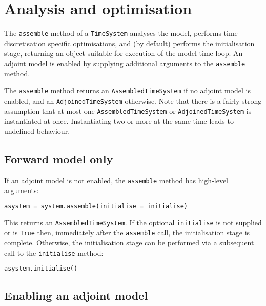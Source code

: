 \documentclass[a4paper]{book}
\begin{document}
\section{Analysis and optimisation}\label{sect:assembly}

The \verb+assemble+ method of a \verb+TimeSystem+ analyses the model, performs
time discretisation specific optimisations, and (by default) performs the
initialisation stage, returning an object suitable for execution of the model
time loop. An adjoint model is enabled by supplying additional arguments to the
\verb+assemble+ method.

The \verb+assemble+ method returns an \verb+AssembledTimeSystem+ if no adjoint
model is enabled, and an \verb+AdjoinedTimeSystem+ otherwise. Note that there is
a fairly strong assumption that at most one \verb+AssembledTimeSystem+ or
\linebreak \verb+AdjoinedTimeSystem+ is instantiated at once. Instantiating two
or more at the same time leads to undefined behaviour.

\subsection{Forward model only}\label{sect:forward_assembly}

If an adjoint model is not enabled, the \verb+assemble+ method has high-level
arguments:
\begin{lstlisting}[language = python, frame = single, basicstyle=\footnotesize]
asystem = system.assemble(initialise = initialise)
\end{lstlisting}
This returns an \verb+AssembledTimeSystem+. If the optional \verb+initialise+ is
not supplied or is \verb+True+ then, immediately after the \verb+assemble+ call,
the initialisation stage is complete. Otherwise, the initialisation stage can be
performed via a subsequent call to the \verb+initialise+ method:
\begin{lstlisting}[language = python, frame = single, basicstyle=\footnotesize]
asystem.initialise()
\end{lstlisting}

\subsection{Enabling an adjoint model}\label{sect:adjoint_assembly}
\end{document}
